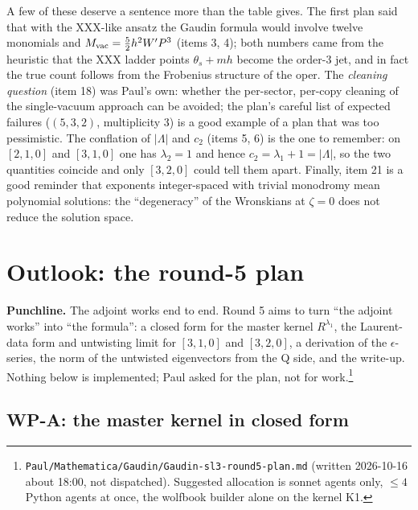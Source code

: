 \documentclass[11pt]{article}
\begin{document}
A few of these deserve a sentence more than the table gives.
The first plan said that with the XXX-like ansatz the Gaudin formula would involve twelve monomials and $M_{\rm vac}=\tfrac52h^2W'P^3$ (items 3, 4); both numbers came from the heuristic that the XXX ladder points $\theta_s+mh$ become the order-3 jet, and in fact the true count follows from the Frobenius structure of the oper.
The \emph{cleaning question} (item 18) was Paul's own: whether the per-sector, per-copy cleaning of the single-vacuum approach can be avoided; the plan's careful list of expected failures ($(5,3,2)$, multiplicity 3) is a good example of a plan that was too pessimistic.
The conflation of $|\Lambda|$ and $c_2$ (items 5, 6) is the one to remember: on $[2,1,0]$ and $[3,1,0]$ one has $\lambda_2=1$ and hence $c_2=\lambda_1+1=|\Lambda|$, so the two quantities coincide and only $[3,2,0]$ could tell them apart.
Finally, item 21 is a good reminder that exponents integer-spaced with trivial monodromy mean polynomial solutions: the ``degeneracy'' of the Wronskians at $\zeta=0$ does not reduce the solution space.

\section{Outlook: the round-5 plan}\label{sec:outlook}

\textbf{Punchline.} The adjoint works end to end.
Round 5 aims to turn ``the adjoint works'' into ``the formula'': a closed form for the master kernel $R^{\lambda_1}$, the Laurent-data form and untwisting limit for $[3,1,0]$ and $[3,2,0]$, a derivation of the $\epsilon$-series, the norm of the untwisted eigenvectors from the Q side, and the write-up.
Nothing below is implemented; Paul asked for the plan, not for work.\footnote{\texttt{Paul/\allowbreak{}Mathematica/\allowbreak{}Gaudin/\allowbreak{}Gaudin-\allowbreak{}sl3-\allowbreak{}round5-\allowbreak{}plan.\allowbreak{}md} (written 2026-10-16 about 18:00, not dispatched).
Suggested allocation is sonnet agents only, $\le4$ Python agents at once, the wolfbook builder alone on the kernel K1.}

\subsection{WP-A: the master kernel in closed form}\label{sec:WPA}
\end{document}
